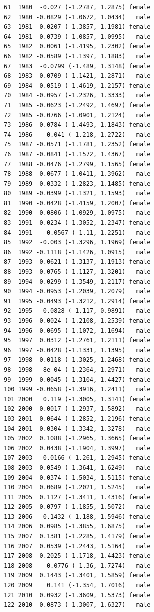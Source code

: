 \documentclass[
  12pt,
]{report}
\begin{document}
\begin{verbatim}
61  1980  -0.027 (-1.2787, 1.2875) female
62  1980 -0.0829 (-1.0672, 1.0434)   male
63  1981 -0.0207 (-1.3857, 1.1981) female
64  1981 -0.0739 (-1.0857, 1.0995)   male
65  1982  0.0061 (-1.4195, 1.2302) female
66  1982 -0.0589 (-1.1397, 1.1883)   male
67  1983  -0.0799 (-1.489, 1.3148) female
68  1983 -0.0709 (-1.1421, 1.2871)   male
69  1984 -0.0519 (-1.4619, 1.2157) female
70  1984 -0.0957 (-1.2326, 1.3333)   male
71  1985 -0.0623 (-1.2492, 1.4697) female
72  1985 -0.0766 (-1.0901, 1.2124)   male
73  1986 -0.0784 (-1.4493, 1.1843) female
74  1986   -0.041 (-1.218, 1.2722)   male
75  1987 -0.0571 (-1.1781, 1.2352) female
76  1987 -0.0841 (-1.1572, 1.4367)   male
77  1988 -0.0476 (-1.2799, 1.1565) female
78  1988 -0.0677 (-1.0411, 1.3962)   male
79  1989 -0.0332 (-1.2823, 1.1485) female
80  1989 -0.0399 (-1.1321, 1.1593)   male
81  1990 -0.0428 (-1.4159, 1.2007) female
82  1990 -0.0806 (-1.0929, 1.0975)   male
83  1991 -0.0234 (-1.3052, 1.2347) female
84  1991   -0.0567 (-1.11, 1.2251)   male
85  1992  -0.003 (-1.3296, 1.1969) female
86  1992 -0.1118 (-1.1426, 1.0915)   male
87  1993 -0.0621 (-1.3137, 1.1913) female
88  1993 -0.0765 (-1.1127, 1.3201)   male
89  1994  0.0299 (-1.3549, 1.2117) female
90  1994 -0.0953 (-1.2039, 1.2079)   male
91  1995 -0.0493 (-1.3212, 1.2914) female
92  1995  -0.0828 (-1.117, 0.9891)   male
93  1996 -0.0024 (-1.2108, 1.2539) female
94  1996 -0.0695 (-1.1072, 1.1694)   male
95  1997  0.0312 (-1.2761, 1.2111) female
96  1997 -0.0428 (-1.1331, 1.1395)   male
97  1998  0.0118 (-1.3025, 1.2468) female
98  1998   8e-04 (-1.2364, 1.2971)   male
99  1999 -0.0045 (-1.3104, 1.4427) female
100 1999 -0.0658 (-1.3916, 1.2411)   male
101 2000   0.119 (-1.3005, 1.3141) female
102 2000  0.0017 (-1.2937, 1.5892)   male
103 2001  0.0644 (-1.2852, 1.2196) female
104 2001 -0.0304 (-1.3342, 1.3278)   male
105 2002  0.1088 (-1.2965, 1.3665) female
106 2002  0.0438 (-1.1904, 1.3997)   male
107 2003  -0.0166 (-1.261, 1.2945) female
108 2003  0.0549 (-1.3641, 1.6249)   male
109 2004  0.0374 (-1.5034, 1.5115) female
110 2004  0.0689 (-1.2021, 1.5245)   male
111 2005  0.1127 (-1.3411, 1.4316) female
112 2005  0.0797 (-1.1855, 1.5072)   male
113 2006   0.1432 (-1.188, 1.5946) female
114 2006  0.0985 (-1.3855, 1.6875)   male
115 2007  0.1381 (-1.2285, 1.4179) female
116 2007  0.0539 (-1.2443, 1.5164)   male
117 2008  0.2025 (-1.1718, 1.4423) female
118 2008    0.0776 (-1.36, 1.7274)   male
119 2009  0.1443 (-1.3401, 1.5859) female
120 2009    0.141 (-1.354, 1.7016)   male
121 2010  0.0932 (-1.3609, 1.5373) female
122 2010  0.0873 (-1.3007, 1.6327)   male

\end{verbatim}
\end{document}
